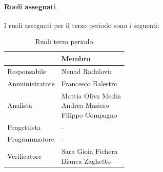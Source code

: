 \documentclass[a4paper,12pt]{article}
\begin{document}
            \paragraph{Ruoli assegnati}
            I ruoli assegnati per il terzo periodo sono i seguenti:
                \begin{table}[H]
                \centering
                \caption{Ruoli terzo periodo}
                \begin{tabular}{|l|l|}
                \hline
                    \rowcolor{lightgray}{\textbf{Ruolo}} & {\textbf{Membro}} \\
                \hline
                    Responsabile & Nenad Radulovic \\
                \hline
                    Amministratore & Francesco Balestro \\
                \hline
                    Analista & \makecell[l]{Mattia Oliva Medin \\ Andrea Masiero \\ Filippo Compagno} \\
                \hline
                    Progettista & - \\
                \hline
                    Programmatore & - \\
                \hline
                    Verificatore & \makecell[l]{Sara Gioia Fichera \\ Bianca Zaghetto} \\
                \hline
                \end{tabular}
                \end{table}
                
\end{document}
